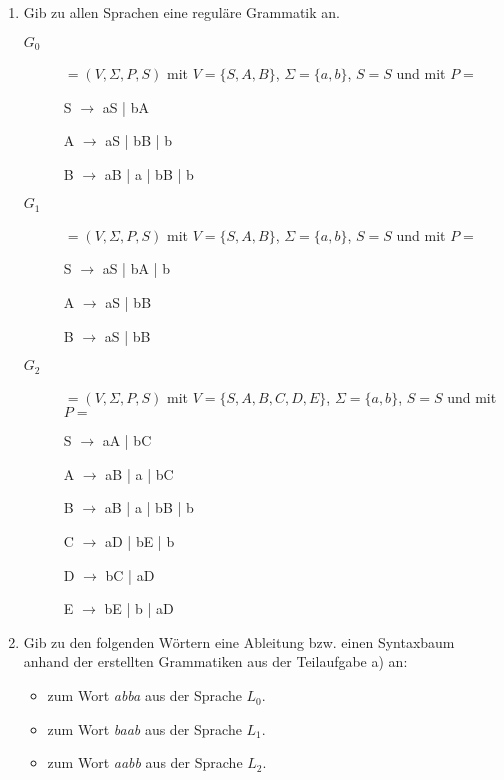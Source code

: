 \documentclass{lehramt-informatik-aufgabe}
\begin{document}
\begin{enumerate}


\item Gib zu allen Sprachen eine reguläre Grammatik an.

\begin{liAntwort}

\begin{description}
%

\item[$G_0$]

$= (V, \Sigma, P, S)$ mit $V = \{S, A, B\}$, $\Sigma = \{a, b\}$, $S = S$ und mit $P =$

S $\rightarrow$ aS | bA

A $\rightarrow$ aS | bB | b

B $\rightarrow$ aB | a | bB | b

%

\item[$G_1$]

$= (V, \Sigma, P, S)$ mit $V = \{S, A, B\}$, $\Sigma = \{a, b\}$, $S = S$ und mit $P =$

S $\rightarrow$ aS | bA | b

A $\rightarrow$ aS | bB

B $\rightarrow$ aS | bB

%

\item[$G_2$]

$= (V, \Sigma, P, S)$ mit $V = \{S, A, B, C, D, E\}$, $\Sigma = \{a, b\}$, $S = S$ und mit $P =$

S $\rightarrow$ aA | bC

A $\rightarrow$ aB | a | bC

B $\rightarrow$ aB | a | bB | b

C $\rightarrow$ aD | bE | b

D $\rightarrow$ bC | aD

E $\rightarrow$ bE | b | aD

\end{description}
\end{liAntwort}


\item Gib zu den folgenden Wörtern eine Ableitung bzw. einen Syntaxbaum
anhand der erstellten Grammatiken aus der Teilaufgabe a) an:

\begin{itemize}
\item zum Wort \emph{abba} aus der Sprache $L_0$.
\item zum Wort \emph{baab} aus der Sprache $L_1$.
\item zum Wort \emph{aabb} aus der Sprache $L_2$.
\end{itemize}


\end{enumerate}
\end{document}

